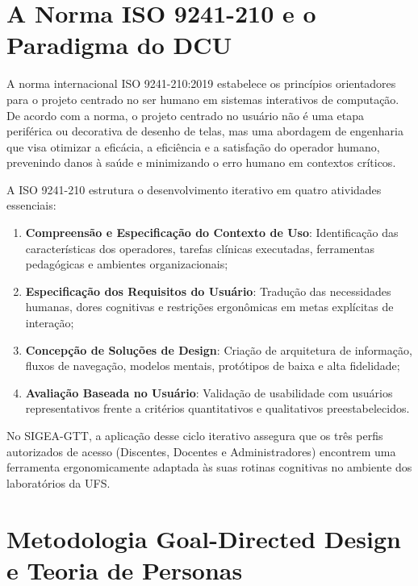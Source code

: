 \section{A Norma ISO 9241-210 e o Paradigma do DCU}
\label{sec_norma_iso_9241}

A norma internacional ISO 9241-210:2019 \cite{iso9241} estabelece os princípios orientadores para o projeto centrado no ser humano em sistemas interativos de computação. De acordo com a norma, o projeto centrado no usuário não é uma etapa periférica ou decorativa de desenho de telas, mas uma abordagem de engenharia que visa otimizar a eficácia, a eficiência e a satisfação do operador humano, prevenindo danos à saúde e minimizando o erro humano em contextos críticos.

A ISO 9241-210 estrutura o desenvolvimento iterativo em quatro atividades essenciais:
\begin{enumerate}
    \item \textbf{Compreensão e Especificação do Contexto de Uso}: Identificação das características dos operadores, tarefas clínicas executadas, ferramentas pedagógicas e ambientes organizacionais;
    \item \textbf{Especificação dos Requisitos do Usuário}: Tradução das necessidades humanas, dores cognitivas e restrições ergonômicas em metas explícitas de interação;
    \item \textbf{Concepção de Soluções de Design}: Criação de arquitetura de informação, fluxos de navegação, modelos mentais, protótipos de baixa e alta fidelidade;
    \item \textbf{Avaliação Baseada no Usuário}: Validação de usabilidade com usuários representativos frente a critérios quantitativos e qualitativos preestabelecidos.
\end{enumerate}

No SIGEA-GTT, a aplicação desse ciclo iterativo assegura que os três perfis autorizados de acesso (Discentes, Docentes e Administradores) encontrem uma ferramenta ergonomicamente adaptada às suas rotinas cognitivas no ambiente dos laboratórios da UFS.

\section{Metodologia Goal-Directed Design e Teoria de Personas}
\label{sec_teoria_personas}

